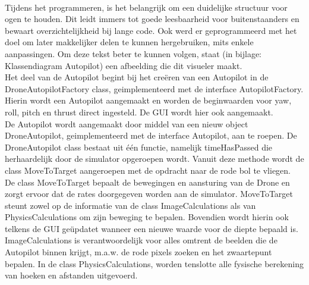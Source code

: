 \\
Tijdens het programmeren, is het belangrijk om een duidelijke structuur voor ogen te houden. Dit leidt immers tot goede leesbaarheid voor buitenstaanders en bewaart overzichtelijkheid bij lange code. Ook werd er geprogrammeerd met het doel om later makkelijker delen te kunnen hergebruiken, mits enkele aanpassingen. Om deze tekst beter te kunnen volgen, staat (in bijlage: Klassendiagram Autopilot) een afbeelding die dit visueler maakt.
\\

Het deel van de Autopilot begint bij het cre\"eren van een Autopilot in de DroneAutopilotFactory class, geimplementeerd met de interface AutopilotFactory. Hierin wordt een Autopilot aangemaakt en worden de beginwaarden voor yaw, roll, pitch en thrust direct ingesteld. De GUI wordt hier ook aangemaakt.
\\

De Autopilot wordt aangemaakt door middel van een nieuw object DroneAutopilot, geimplementeerd met de interface Autopilot, aan te roepen. De DroneAutopilot class bestaat uit één functie, namelijk timeHasPassed die herhaardelijk door de simulator opgeroepen wordt. Vanuit deze methode wordt de class MoveToTarget aangeroepen met de opdracht naar de rode bol te vliegen.  
\\

De class MoveToTarget bepaalt de bewegingen en aansturing van de Drone en zorgt ervoor dat de rates doorgegeven worden aan de simulator. MoveToTarget steunt zowel op de informatie van de class ImageCalculations als van PhysicsCalculations om zijn beweging te bepalen. Bovendien wordt hierin ook telkens de GUI ge\"updatet wanneer een nieuwe waarde voor de diepte bepaald is.
\\

ImageCalculations is verantwoordelijk voor alles omtrent de beelden die de Autopilot binnen krijgt, m.a.w. de rode pixels zoeken en het zwaartepunt bepalen.
In de class PhysicsCalculations, worden tenslotte alle fysische berekening van hoeken en afstanden uitgevoerd.